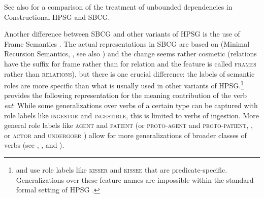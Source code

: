 \documentclass[output=paper,biblatex,babelshorthands,newtxmath,draftmode,colorlinks,citecolor=brown]{langscibook}
\begin{document}
See also  for a comparison of the treatment of unbounded dependencies in
Constructional HPSG and SBCG.

\label{sec-frame-semantics-SBCG}

Another difference between SBCG and other variants of HPSG is the use of Frame Semantics
\citep{Fillmore82a-u,Fillmore85b-u}. The actual representations in SBCG are based on \mrs (Minimal
Recursion Semantics, \citealt{CFPS2005a}, see also ) and
the change seems rather cosmetic (relations have the suffix  for frame rather than
 for relation and the feature is called \textsc{frames} rather than
\textsc{relations}), but there is one crucial difference: the labels of semantic roles
are more specific than what is usually used in other variants of HPSG.\footnote{%
  \citet[]{ps} and \citet{ps2} use role labels like \textsc{kisser} and \textsc{kissee} that are predicate-specific.
  Generalizations over these feature names are impossible within the standard formal setting of
  HPSG \parencites[Section~8.5.3]{ps2}[, Fn.~1]{Mueller99a}[Section~4.2.1]{Davis2001a-u}.%
}
\citet[]{Sag2012a} provides the following representation for the meaning contribution of the
verb \emph{eat}:
\ea
{}
\z
While some generalizations over verbs of a certain type can be captured with role labels like
\textsc{ingestor} and \textsc{ingestible}, this is limited to verbs of ingestion. More general role
labels like \textsc{agent} and \textsc{patient} (or \textsc{proto-agent} and \pagebreak\textsc{proto-patient},
\citealt{Dowty91a}, or \textsc{actor} and \textsc{undergoer} \citealt{VanValin99a-u}) allow for more generalizations of broader classes of verbs (see
\citealt{DK2000b-u}, \citealt[Section~4.2.1]{Davis2001a-u}, and ).
\end{document}
